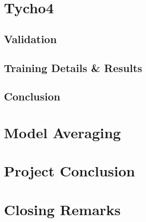 \documentclass[12pt,a4paper,oneside,oldfontcommands]{memoir}
\begin{document}
\chapter{Tycho4}

\section{Validation}

\section{Training Details & Results}

\section{Conclusion}

\chapter{Model Averaging}

\chapter{Project Conclusion}

\chapter{Closing Remarks}


\appendix

\renewcommand{\bibname}{References}


\end{document}

